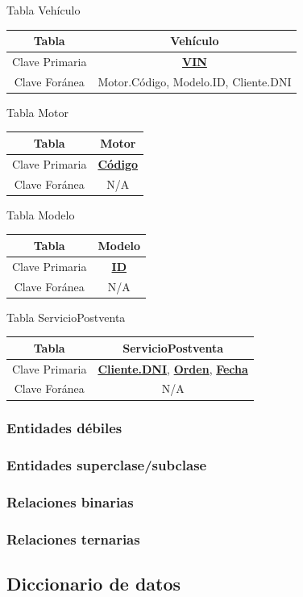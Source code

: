 \documentclass[12pt]{article}
\begin{document}
Tabla Vehículo
\begin{tabular}{|c|c|}
\hline
Tabla & Vehículo \\
\hline
Clave Primaria & \textbf{\underline{VIN}} \\
\hline
Clave Foránea & Motor.Código, Modelo.ID, Cliente.DNI \\
\hline
\end{tabular}

Tabla Motor
\begin{tabular}{|c|c|}
\hline
Tabla & Motor \\
\hline
Clave Primaria & \textbf{\underline{Código}} \\
\hline
Clave Foránea & N/A \\
\hline
\end{tabular}

Tabla Modelo
\begin{tabular}{|c|c|}
\hline
Tabla & Modelo \\
\hline
Clave Primaria & \textbf{\underline{ID}} \\
\hline
Clave Foránea & N/A \\
\hline
\end{tabular}

Tabla ServicioPostventa
\begin{tabular}{|c|c|}
\hline
Tabla & ServicioPostventa \\
\hline
Clave Primaria & \textbf{\underline{Cliente.DNI}}, \textbf{\underline{Orden}}, \textbf{\underline{Fecha}} \\
\hline
Clave Foránea & N/A \\
\hline
\end{tabular}


\subsubsection{Entidades d\'ebiles}
\subsubsection{Entidades superclase/subclase}
\subsubsection{Relaciones binarias}
\subsubsection{Relaciones ternarias}

\subsection{Diccionario de datos}
\end{document}
